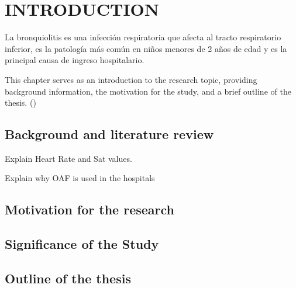 \section{INTRODUCTION} \label{sec:itroduction}

La bronquiolitis es una infección respiratoria que afecta al tracto respiratorio inferior, es la patología más común en niños menores de 2 años de edad y es la principal causa de ingreso hospitalario.   

This chapter serves as an introduction to the research topic, providing background information, the motivation for the study, and a brief outline of the thesis. (\cite{CrespoRegalado2019FactoresDR})


\subsection{Background and literature review}

Explain Heart Rate and Sat values. 

Explain why OAF is used in the hospitals


\subsection{Motivation for the research}

\subsection{Significance of the Study}


\subsection{Outline of the thesis}


